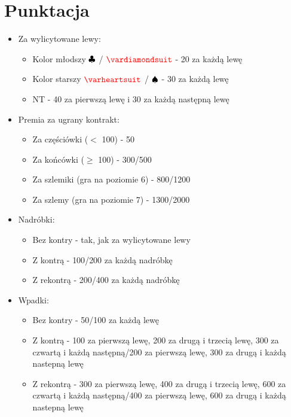 \documentclass{article}
\newcommand*\Hs[1]{\ensuremath{\color{red}\varheartsuit}}
\newcommand*\Ss[1]{\ensuremath{\color{black}\spadesuit}}
\newcommand*\Ds[1]{\ensuremath{\color{red}\vardiamondsuit}}
\newcommand*\Cs[1]{\ensuremath{\color{black}\clubsuit}}
\newcommand*\NT[1]{{\color{black}\textsc{NT}}}
\begin{document}
    \section{Punktacja}
    	\begin{itemize}
    	\item Za wylicytowane lewy:
    		\begin{itemize}
    		\item Kolor młodszy \Cs{} / \Ds{} - 20 za każdą lewę
    		\item Kolor starszy \Hs{} / \Ss{} - 30 za każdą lewę
    		\item \NT{} - 40 za pierwszą lewę i 30 za każdą następną lewę
    		\end{itemize}
    	\item Premia za ugrany kontrakt:
    		\begin{itemize}
    		\item Za częściówki ($<$ 100) - 50
    		\item Za końcówki ($\geq$ 100) - {\color{green}300}/{\color{red}500}
    		\item Za szlemiki (gra na poziomie 6) - {\color{green}800}/{\color{red}1200}
    		\item Za szlemy (gra na poziomie 7) - {\color{green}1300}/{\color{red}2000}
    		\end{itemize}    	
    	\item Nadróbki:
    		\begin{itemize}
    		\item Bez kontry - tak, jak za wylicytowane lewy
    		\item Z kontrą - {\color{green}100}/{\color{red}200} za każdą nadróbkę
    		\item Z rekontrą - {\color{green}200}/{\color{red}400} za każdą nadróbkę
    		\end{itemize}  	
    	\item Wpadki:
    		\begin{itemize}
    		\item Bez kontry - {\color{green}50}/{\color{red}100} za każdą lewę
    		\item Z kontrą - {\color{green}100} za pierwszą lewę, {\color{green}200} za drugą i trzecią lewę, {\color{green}300} za czwartą i każdą następną/{\color{red}200} za pierwszą lewę, {\color{red}300} za drugą i każdą nastepną lewę
    		\item Z rekontrą - {\color{green}300} za pierwszą lewę, {\color{green}400} za drugą i trzecią lewę, {\color{green}600} za czwartą i każdą następną/{\color{red}400} za pierwszą lewę, {\color{red}600} za drugą i każdą nastepną lewę
    		\end{itemize}
    	\end{itemize}
\end{document}
